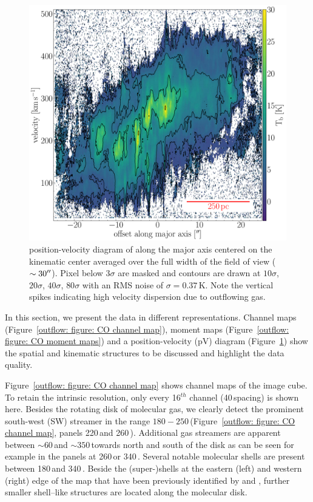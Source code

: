 \begin{figure}
	\centering
	\includegraphics[width=0.6\linewidth]{images/chapters/papers/outflow/outflow_fig3.pdf}
	\caption[NGC253  position-velocity diagram]{ position-velocity diagram of  along the major axis centered on the kinematic center averaged over the full width of the field of view ($\sim 30^{\prime\prime}$). Pixel below $3\sigma$ are masked and contours are drawn at $10\sigma$, $20\sigma$, $40\sigma$, $80\sigma$ with an RMS noise of $\sigma = 0.37$\,K. Note the vertical spikes indicating high velocity dispersion due to outflowing gas.}
	\label{outflow: figure: co pV}
\end{figure}

In this section, we present the  data in different representations. Channel maps (Figure~\ref{outflow: figure: CO channel map}), moment maps (Figure~\ref{outflow: figure: CO moment maps}) and a position-velocity (pV) diagram (Figure~\ref{outflow: figure: co pV}) show the spatial and kinematic structures to be discussed and highlight the data quality.

Figure~\ref{outflow: figure: CO channel map} shows channel maps of the image cube. To retain the intrinsic resolution, only every 16$^{th}$ channel (40\,\kms spacing) is shown here. Besides the rotating disk of molecular gas, we clearly detect the prominent south-west (SW) streamer \citep{2017ApJ...835..265W} in the range $180 - 250$\,\kms (Figure~\ref{outflow: figure: CO channel map}, panels 220\,\kms and 260\,\kms). Additional gas streamers are apparent between $\sim 60$\,\kms and $\sim 350$\,\kms towards north and south of the disk as can be seen for example in the panels at 260\,\kms or 340\,\kms. Several notable molecular shells are present between 180\,\kms and 340\,\kms. Beside the (super-)shells at the eastern (left) and western (right) edge of the map that have been previously identified by \citet{2006ApJ...636..685S} and \citet{2013Natur.499..450B}, further smaller shell--like structures are located along the molecular disk.

